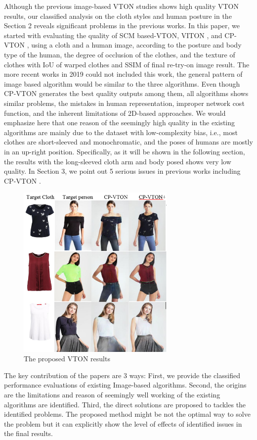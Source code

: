 Although the previous image-based VTON studies shows high quality VTON results, our classified analysis on the cloth styles and human posture in the Section 2 reveals significant problems in the previous works. In this paper, we started with evaluating the quality of SCM\cite{BelongieMP02} based-VTON, VITON \cite{Han2017VITONAI}, and CP-VTON \cite{Wang2018TowardCI}, using a cloth and a human image, according to the posture and body type of the human, the degree of occlusion of the clothes, and the texture of clothes with IoU of warped clothes and SSIM of final re-try-on image result. The more recent works in 2019 could not included this work, the general pattern of image based algorithm would be similar to the three algorithms. Even though CP-VTON generates the best quality outputs among them, all algorithms shows similar problems, the mistakes in human representation, improper network cost function, and the inherent limitations of 2D-based approaches.   
%
We would emphasize here that one reason of the seemingly high quality in the existing algorithms are mainly due to the dataset with low-complexity bias, i.e., most clothes are short-sleeved  and monochromatic, and the poses of humans are mostly in an up-right position. Specifically, as it will be shown in the following section, the results with the long-sleeved cloth arm and body posed shows very low quality. In Section 3, we point out 5 serious issues in previous works including CP-VTON \cite{Wang2018TowardCI}.  


\begin{figure}
\centering
\includegraphics[height=8.5cm, scale=1]{figures/cpvton_cpvton+keyresult.png}   %
\caption{The proposed VTON results}
\label{fig:cpvton_cpvton+keyresult}
\end{figure}

The key contribution of the papers are 3 ways: First, we provide the classified performance evaluations of existing Image-based algorithms. Second, the origins are the limitations and reason of seemingly well working of the existing algorithms are  identified. Third, the direct solutions are proposed to tackles the identified problems. The proposed method might be not the optimal way to solve the problem but it can explicitly show the level of effects of identified issues in the final results.
